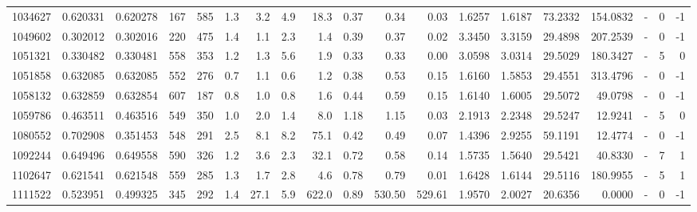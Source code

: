 \begin{tabular}{rrrrrrrrrrrrrrrrlrr}
   1034627 & 0.620331 &   0.620278 &  167 &  585 &      1.3 &      3.2 &     4.9 &     18.3 &       0.37 &        0.34 &        0.03 &  1.6257 &  1.6187 &   73.2332 &  154.0832 &             - &        0 &         -1 \\
   1049602 & 0.302012 &   0.302016 &  220 &  475 &      1.4 &      1.1 &     2.3 &      1.4 &       0.39 &        0.37 &        0.02 &  3.3450 &  3.3159 &   29.4898 &  207.2539 &             - &        0 &         -1 \\
   1051321 & 0.330482 &   0.330481 &  558 &  353 &      1.2 &      1.3 &     5.6 &      1.9 &       0.33 &        0.33 &        0.00 &  3.0598 &  3.0314 &   29.5029 &  180.3427 &             - &        5 &          0 \\
   1051858 & 0.632085 &   0.632085 &  552 &  276 &      0.7 &      1.1 &     0.6 &      1.2 &       0.38 &        0.53 &        0.15 &  1.6160 &  1.5853 &   29.4551 &  313.4796 &             - &        0 &         -1 \\
   1058132 & 0.632859 &   0.632854 &  607 &  187 &      0.8 &      1.0 &     0.8 &      1.6 &       0.44 &        0.59 &        0.15 &  1.6140 &  1.6005 &   29.5072 &   49.0798 &             - &        0 &         -1 \\
   1059786 & 0.463511 &   0.463516 &  549 &  350 &      1.0 &      2.0 &     1.4 &      8.0 &       1.18 &        1.15 &        0.03 &  2.1913 &  2.2348 &   29.5247 &   12.9241 &             - &        5 &          0 \\
   1080552 & 0.702908 &   0.351453 &  548 &  291 &      2.5 &      8.1 &     8.2 &     75.1 &       0.42 &        0.49 &        0.07 &  1.4396 &  2.9255 &   59.1191 &   12.4774 &             - &        0 &         -1 \\
   1092244 & 0.649496 &   0.649558 &  590 &  326 &      1.2 &      3.6 &     2.3 &     32.1 &       0.72 &        0.58 &        0.14 &  1.5735 &  1.5640 &   29.5421 &   40.8330 &             - &        7 &          1 \\
   1102647 & 0.621541 &   0.621548 &  559 &  285 &      1.3 &      1.7 &     2.8 &      4.6 &       0.78 &        0.79 &        0.01 &  1.6428 &  1.6144 &   29.5116 &  180.9955 &             - &        5 &          1 \\
   1111522 & 0.523951 &   0.499325 &  345 &  292 &      1.4 &     27.1 &     5.9 &    622.0 &       0.89 &      530.50 &      529.61 &  1.9570 &  2.0027 &   20.6356 &    0.0000 &             - &        0 &         -1 \\

\end{tabular}
